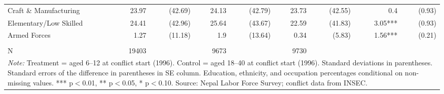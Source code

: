 \begin{landscape}
\begin{table}[!h]
{\begin{tabular}[t]{lrrrrrrrr}
Craft \& Manufacturing & 23.97 & (42.69) & 24.13 & (42.79) & 23.73 & (42.55) & 0.4 & (0.93)\\
\addlinespace
Elementary/Low Skilled & 24.41 & (42.96) & 25.64 & (43.67) & 22.59 & (41.83) & 3.05*** & (0.93)\\
Armed Forces & 1.27 & (11.18) & 1.9 & (13.64) & 0.34 & (5.83) & 1.56*** & (0.21)\\
 &  &  &  &  &  &  &  & \\
N & 19403 &  & 9673 &  & 9730 &  &  & \\
\bottomrule
\multicolumn{9}{l}{\rule{0pt}{1em}\textit{Note: } Treatment = aged 6--12 at conflict start (1996). Control = aged 18--40 at conflict start (1996). Standard deviations in parentheses. Standard errors of the difference in parentheses in SE column. Education, ethnicity, and occupation percentages conditional on non-missing values. *** p$<$0.01, ** p$<$0.05, * p$<$0.10. Source: Nepal Labor Force Survey; conflict data from INSEC.}\\
\end{tabular}}
\end{table}
\end{landscape}
